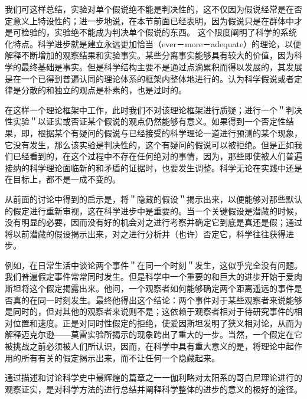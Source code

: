 我们可这样总结，实验对单个假说绝不能是判决性的，这不仅因为假说经常是在否定意义上特设性的；进一步地说，在本节前面已经表明，因为假说只是在群体中才是可检验的，实验绝不能成为判决单个假说的东西。\cite{popper1963} 这个限度阐明了科学的系统化特点。科学进步就是建立永远更加恰当（ever－more－adequate）的理论，以便解释不断增加的观察结果和实验事实。某些分离事实能够具有较大的价值，因为科学的最终基础是事实。但是科学结构主要不是通过点滴累积而得以发展的，其发展是在一个已得到普遍认同的理论体系的框架内整体地进行的。认为科学假说或者定律是分散的和独立的观点是朴素的，也是过时的。

在这样一个理论框架中工作，此时我们不对该理论框架进行质疑；进行一个＂判决性实验＂以证实或否证某个假说的观点仍然能够有意义。如果得到一个否定性结果，即，根据某个有疑问的假说与已经接受的科学理论一道进行预测的某个现象，它没有发生，那么该实验是判决性的，这个有疑问的假说可以被拒绝。但是正如我们已经看到的，在这个过程中不存在任何绝对的事情，因为，那些即使被人们普遍接纳的科学理论面临新的和矛盾的证据时，也要发生调整。科学无论在实践中还是在目标上，都不是一成不变的。

从前面的讨论中得到的启示是，将＂隐藏的假设＂揭示出来，以便能够对那些默认的假定进行重新审视，这在科学进步中是重要的。当一个关键假设是潜藏的时候，没有明显的必要，因而没有好的机会对之进行考察并确定它到底是真还是假；通过将以前潜藏的假设揭示出来，对之进行分析并（也许）否定它，科学往往获得进步。

例如，在日常生活中谈论两个事件＂在同一个时刻＂发生，这似乎完全没有问题。我们普遍假定事件常常同时发生。但是科学中一个重要的和巨大的进步开始于爱肉斯坦将这个假定揭露出来。他问，一个观察者如何能够确定两个距离遥远的事件是否真的在同一时刻发生。最终他得出这个结论：两个事件对于某些观察者来说能够是同时的，但对其他的观察者来说则不是；这依赖于观察者相对于待研究事件的相对位置和速度。正是对同时性假定的拒绝，使爱因斯坦发明了狭义相对论，从而为解释迈克尔逊——莫雷实验所揭示的现象跨出了重大的一步。当然，一个假定在它被挑战之前必须被人们所认识，因而，在科学中具有重大意义的是，将理论中起作用的所有有关的假定揭示出来，而不让任何一个隐藏起来。

通过描述和讨论科学史中最辉煌的篇章之一一伽利略对太阳系的哥白尼理论进行的观察证实，是对科学方法的进行总结并阐释科学整体的进步的意义的极好的途径。

